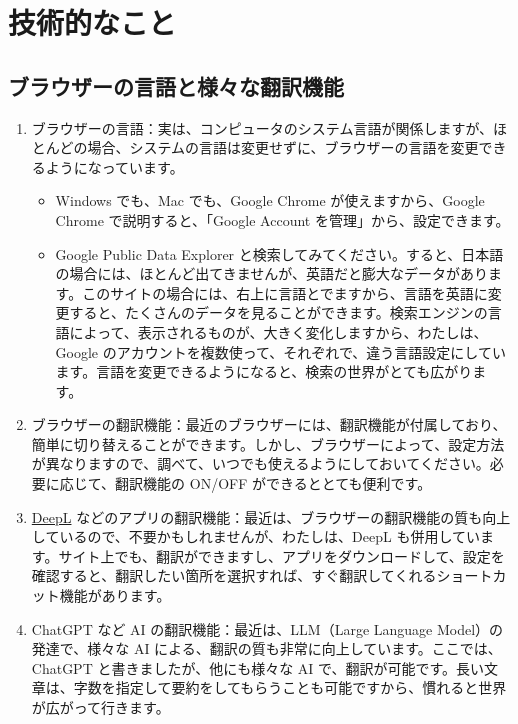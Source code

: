 \documentclass[
  xelatex, ja=standard]{bxjsbook}
\theoremstyle{definition}
\theoremstyle{definition}
\theoremstyle{definition}
\theoremstyle{definition}
\theoremstyle{remark}
\begin{document}
\hypertarget{ux6280ux8853ux7684ux306aux3053ux3068}{%
\section{技術的なこと}\label{ux6280ux8853ux7684ux306aux3053ux3068}}

\hypertarget{ux30d6ux30e9ux30a6ux30b6ux30fcux306eux8a00ux8a9eux3068ux69d8ux3005ux306aux7ffbux8a33ux6a5fux80fd}{%
\subsection{ブラウザーの言語と様々な翻訳機能}\label{ux30d6ux30e9ux30a6ux30b6ux30fcux306eux8a00ux8a9eux3068ux69d8ux3005ux306aux7ffbux8a33ux6a5fux80fd}}

\begin{enumerate}
\def\labelenumi{\arabic{enumi}.}
\item
  ブラウザーの言語：実は、コンピュータのシステム言語が関係しますが、ほとんどの場合、システムの言語は変更せずに、ブラウザーの言語を変更できるようになっています。

  \begin{itemize}
  \item
    Windows でも、Mac でも、Google Chrome が使えますから、Google Chrome で説明すると、「Google Account を管理」から、設定できます。
  \item
    Google Public Data Explorer と検索してみてください。すると、日本語の場合には、ほとんど出てきませんが、英語だと膨大なデータがあります。このサイトの場合には、右上に言語とでますから、言語を英語に変更すると、たくさんのデータを見ることができます。検索エンジンの言語によって、表示されるものが、大きく変化しますから、わたしは、Google のアカウントを複数使って、それぞれで、違う言語設定にしています。言語を変更できるようになると、検索の世界がとても広がります。
  \end{itemize}
\item
  ブラウザーの翻訳機能：最近のブラウザーには、翻訳機能が付属しており、簡単に切り替えることができます。しかし、ブラウザーによって、設定方法が異なりますので、調べて、いつでも使えるようにしておいてください。必要に応じて、翻訳機能の ON/OFF ができるととても便利です。
\item
  \href{https://www.deepl.com/ja/translator}{DeepL} などのアプリの翻訳機能：最近は、ブラウザーの翻訳機能の質も向上しているので、不要かもしれませんが、わたしは、DeepL も併用しています。サイト上でも、翻訳ができますし、アプリをダウンロードして、設定を確認すると、翻訳したい箇所を選択すれば、すぐ翻訳してくれるショートカット機能があります。
\item
  ChatGPT など AI の翻訳機能：最近は、LLM（Large Language Model）の発達で、様々な AI による、翻訳の質も非常に向上しています。ここでは、ChatGPT と書きましたが、他にも様々な AI で、翻訳が可能です。長い文章は、字数を指定して要約をしてもらうことも可能ですから、慣れると世界が広がって行きます。
\end{enumerate}
\end{document}
